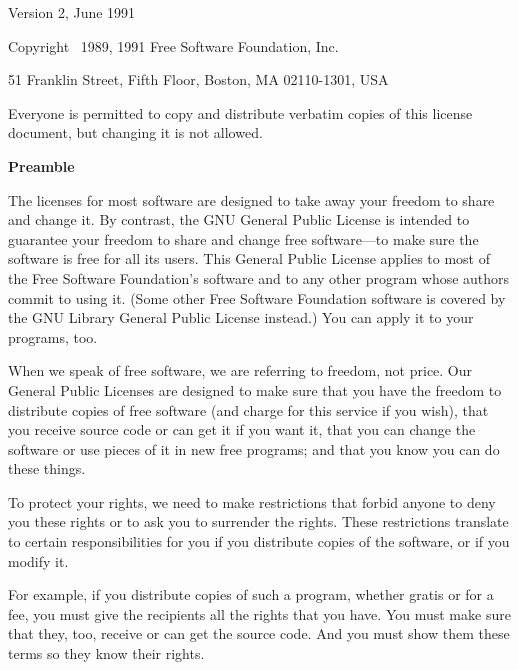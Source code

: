 \newsavebox{\gpl}
\begin{lrbox}{\gpl}
\begin{minipage}{3\textwidth}
\columnsep
\begintriplecolumns
\begincentered
  {\par}
  \bigskip
  {Version 2, June 1991}

  \begingroup
    \parindent 0in

    Copyright \textcopyright\ 1989, 1991 Free Software Foundation, Inc.

    \bigskip

    51 Franklin Street, Fifth Floor, Boston, MA  02110-1301, USA

    \bigskip

    Everyone is permitted to copy and distribute verbatim copies
    of this license document, but changing it is not allowed.
  \endgroup

  {\bf\large Preamble}
\endcentered

The licenses for most software are designed to take away your freedom to
share and change it.  By contrast, the GNU General Public License is
intended to guarantee your freedom to share and change free software---to
make sure the software is free for all its users.  This General Public
License applies to most of the Free Software Foundation's software and to
any other program whose authors commit to using it.  (Some other Free
Software Foundation software is covered by the GNU Library General Public
License instead.)  You can apply it to your programs, too.

When we speak of free software, we are referring to freedom, not price.
Our General Public Licenses are designed to make sure that you have the
freedom to distribute copies of free software (and charge for this service
if you wish), that you receive source code or can get it if you want it,
that you can change the software or use pieces of it in new free programs;
and that you know you can do these things.

To protect your rights, we need to make restrictions that forbid anyone to
deny you these rights or to ask you to surrender the rights.  These
restrictions translate to certain responsibilities for you if you
distribute copies of the software, or if you modify it.

For example, if you distribute copies of such a program, whether gratis or
for a fee, you must give the recipients all the rights that you have.  You
must make sure that they, too, receive or can get the source code.  And
you must show them these terms so they know their rights.


\end{minipage}
\end{lrbox}
